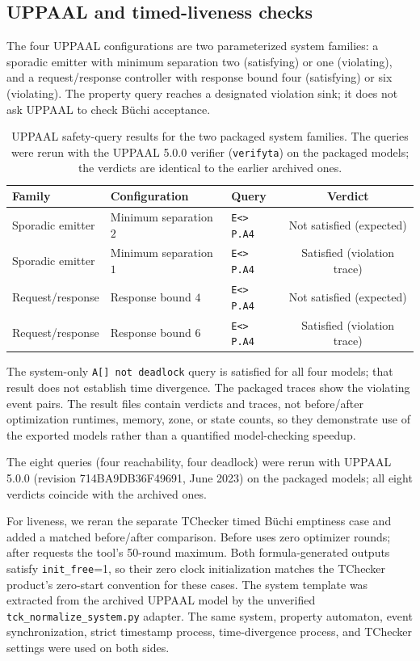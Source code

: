 \subsection{UPPAAL and timed-liveness checks}
The four UPPAAL configurations are two parameterized system families: a
sporadic emitter with minimum separation two (satisfying) or one (violating),
and a request/response controller with response bound four (satisfying) or
six (violating). The property query reaches a designated violation sink; it
does not ask UPPAAL to check B\"uchi acceptance.
\begin{table}[t]
\centering
\caption{UPPAAL safety-query results for the two packaged system families. The queries were rerun with the UPPAAL 5.0.0 verifier (\texttt{verifyta}) on the packaged models; the verdicts are identical to the earlier archived ones.}
\label{tab:uppaal-results}
\scriptsize
\begin{tabular}{@{}lllc@{}}
\toprule
Family & Configuration & Query & Verdict\\
\midrule
Sporadic emitter & Minimum separation $2$ & \texttt{E<> P.A4} & Not satisfied (expected)\\
Sporadic emitter & Minimum separation $1$ & \texttt{E<> P.A4} & Satisfied (violation trace)\\
Request/response & Response bound $4$ & \texttt{E<> P.A4} & Not satisfied (expected)\\
Request/response & Response bound $6$ & \texttt{E<> P.A4} & Satisfied (violation trace)\\
\bottomrule
\end{tabular}
\end{table}
The system-only \texttt{A[] not deadlock} query is satisfied for
all four models; that result does not establish time divergence. The packaged
traces show the violating event pairs. The result files contain verdicts and
traces, not before/after optimization runtimes, memory, zone, or state counts,
so they demonstrate use of the exported models rather than a quantified
model-checking speedup.

The eight queries (four reachability, four deadlock) were rerun with
UPPAAL 5.0.0 (revision 714BA9DB36F49691, June 2023) on the packaged models;
all eight verdicts coincide with the archived ones.

For liveness, we reran the separate TChecker timed B\"uchi emptiness case and
added a matched before/after comparison. Before uses zero optimizer rounds;
after requests the tool's 50-round maximum. Both formula-generated outputs
satisfy \texttt{init\_free}=1, so their zero clock initialization matches the
TChecker product's zero-start convention for these cases. The system template
was extracted from the archived UPPAAL model by the unverified
\texttt{tck\_normalize\_system.py} adapter. The same system, property
automaton, event synchronization, strict timestamp process, time-divergence
process, and TChecker settings were used on both sides.

